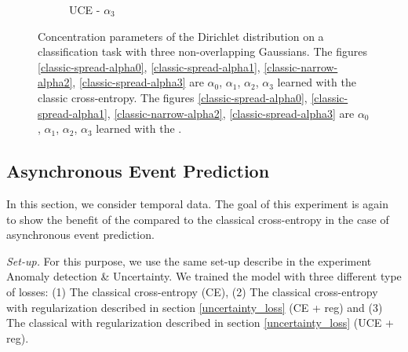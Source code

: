 \begin{figure}[H]
\begin{subfigure}{0.26\textwidth}
        \caption{UCE - $\alpha_3$}
        \label{new-spread-alpha3}
    \end{subfigure}
    \caption{Concentration parameters of the Dirichlet distribution on a classification task with three non-overlapping Gaussians. The figures \ref{classic-spread-alpha0}, \ref{classic-spread-alpha1}, \ref{classic-narrow-alpha2}, \ref{classic-spread-alpha3} are $\alpha_0$, $\alpha_1$, $\alpha_2$, $\alpha_3$ learned with the classic cross-entropy. The figures \ref{classic-spread-alpha0}, \ref{classic-spread-alpha1}, \ref{classic-narrow-alpha2}, \ref{classic-spread-alpha3} are $\alpha_0$, $\alpha_1$, $\alpha_2$, $\alpha_3$ learned with the \UncertaintyLoss.}
    \label{fig:alpha_classification2}
\end{figure}

\subsection{Asynchronous Event Prediction}

In this section, we consider temporal data. The goal of this experiment is again to show the benefit of the \UncertaintyLoss compared to the classical cross-entropy in the case of asynchronous event prediction.

\textit{Set-up.} For this purpose, we use the same set-up describe in the experiment Anomaly detection \& Uncertainty. We trained the model \DirModel with three different type of losses: (1) The classical cross-entropy (CE), (2) The classical cross-entropy with regularization described in section \ref{uncertainty_loss} (CE + reg) and (3) The classical \UncertaintyLoss with regularization described in section \ref{uncertainty_loss} (UCE + reg).

